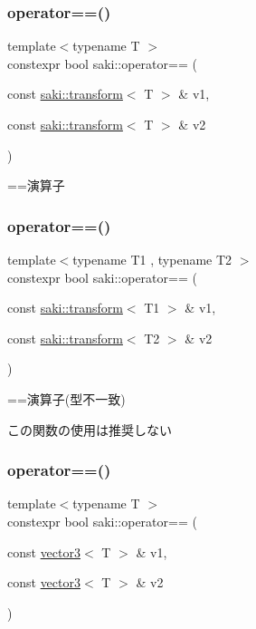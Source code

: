 \subsubsection{\texorpdfstring{operator==()}{operator==()}\hspace{0.1cm}{\footnotesize\ttfamily [2/11]}}
{\footnotesize\ttfamily template$<$typename T $>$ \\
constexpr bool saki\+::operator== (\begin{DoxyParamCaption}\item[{const \mbox{\hyperlink{classsaki_1_1transform}{saki\+::transform}}$<$ T $>$ \&}]{v1,  }\item[{const \mbox{\hyperlink{classsaki_1_1transform}{saki\+::transform}}$<$ T $>$ \&}]{v2 }\end{DoxyParamCaption})}



==演算子 

\mbox{\label{namespacesaki_afde7d962261485c2054cd1a98ed337ed}} 
\subsubsection{\texorpdfstring{operator==()}{operator==()}\hspace{0.1cm}{\footnotesize\ttfamily [3/11]}}
{\footnotesize\ttfamily template$<$typename T1 , typename T2 $>$ \\
constexpr bool saki\+::operator== (\begin{DoxyParamCaption}\item[{const \mbox{\hyperlink{classsaki_1_1transform}{saki\+::transform}}$<$ T1 $>$ \&}]{v1,  }\item[{const \mbox{\hyperlink{classsaki_1_1transform}{saki\+::transform}}$<$ T2 $>$ \&}]{v2 }\end{DoxyParamCaption})}



==演算子(型不一致) 

この関数の使用は推奨しない \mbox{\label{namespacesaki_a3ce1faca02399d52a09851a1b6e8afe3}} 
\subsubsection{\texorpdfstring{operator==()}{operator==()}\hspace{0.1cm}{\footnotesize\ttfamily [4/11]}}
{\footnotesize\ttfamily template$<$typename T $>$ \\
constexpr bool saki\+::operator== (\begin{DoxyParamCaption}\item[{const \mbox{\hyperlink{classsaki_1_1vector3}{vector3}}$<$ T $>$ \&}]{v1,  }\item[{const \mbox{\hyperlink{classsaki_1_1vector3}{vector3}}$<$ T $>$ \&}]{v2 }\end{DoxyParamCaption})}



